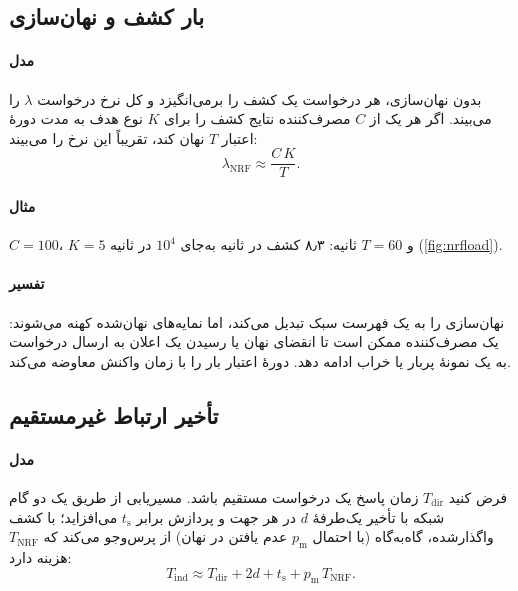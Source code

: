 \documentclass[11pt,a4paper]{article}
\begin{document}
\subsection{بار کشف و نهان‌سازی}\label{sec:cache}
\paragraph{مدل} بدون نهان‌سازی، هر درخواست یک کشف را برمی‌انگیزد و  کل نرخ درخواست $\lambda$ را می‌بیند. اگر هر یک از
$C$ مصرف‌کننده نتایج کشف را برای $K$ نوع هدف به مدت دورهٔ اعتبار $T$ نهان کند،  تقریباً این نرخ را می‌بیند:
\begin{equation}\label{eq:cache}
  \lambda_{\mathrm{NRF}} \approx \frac{C\,K}{T}.
\end{equation}
\paragraph{مثال} $C = 100$، $K = 5$ و $T = 60$ ثانیه: ۸٫۳ کشف در ثانیه به‌جای $10^4$ در ثانیه (\cref{fig:nrfload}).
\paragraph{تفسیر} نهان‌سازی  را به یک فهرست سبک تبدیل می‌کند، اما نمایه‌های نهان‌شده کهنه می‌شوند: یک مصرف‌کننده ممکن است
تا انقضای نهان یا رسیدن یک اعلان به ارسال درخواست به یک نمونهٔ پربار یا خراب ادامه دهد. دورهٔ اعتبار بار  را با زمان
واکنش معاوضه می‌کند.

\begin{acnfigure}
  \caption{بار کشف  بر حسب دورهٔ اعتبار نهان (\cref{eq:cache}).}
  \label{fig:nrfload}
\end{acnfigure}

\subsection{تأخیر ارتباط غیرمستقیم}\label{sec:indirect}
\paragraph{مدل} فرض کنید $T_{\mathrm{dir}}$ زمان پاسخ یک درخواست مستقیم باشد. مسیریابی از طریق یک  دو گام شبکه با تأخیر
یک‌طرفهٔ $d$ در هر جهت و پردازش  برابر $t_{\mathrm{s}}$ می‌افزاید؛ با کشف واگذارشده،  گاه‌به‌گاه (با احتمال
$p_{\mathrm{m}}$ عدم یافتن در نهان) از  پرس‌وجو می‌کند که $T_{\mathrm{NRF}}$ هزینه دارد:
\begin{equation}\label{eq:indirect}
  T_{\mathrm{ind}} \approx T_{\mathrm{dir}} + 2d + t_{\mathrm{s}} + p_{\mathrm{m}}\,T_{\mathrm{NRF}} .
\end{equation}
\end{document}
